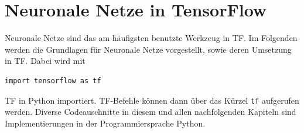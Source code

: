 \chapter{Neuronale Netze in TensorFlow}
Neuronale Netze sind das am h\"aufigsten benutzte Werkzeug in \gls{TF}. Im Folgenden werden die Grundlagen f\"ur Neuronale Netze vorgestellt, sowie deren Umsetzung in \gls{TF}. Dabei wird mit \cite{cookbook}
\vspace{0.3cm}
\begin{lstlisting}
import tensorflow as tf
\end{lstlisting} \gls{TF} in Python importiert. \gls{TF}-Befehle können dann über das Kürzel \lstinline$tf$ aufgerufen werden. Diverse Codeauschnitte in diesem und allen nachfolgenden Kapiteln sind Implementierungen in der Programmiersprache Python.



